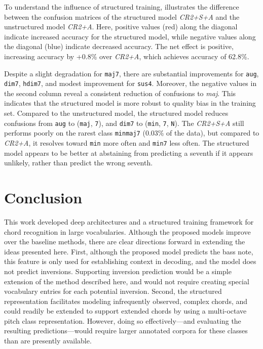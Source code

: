 \documentclass{article}
\begin{document}
To understand the influence of structured training,  illustrates the difference between the confusion matrices of the structured model \emph{CR2+S+A} and the unstructured model \emph{CR2+A}.
Here, positive values (red) along the diagonal indicate increased accuracy for the structured model, while negative values along the diagonal (blue) indicate decreased accuracy.
The net effect is positive, increasing accuracy by +0.8\% over \emph{CR2+A}, which achieves accuracy of 62.8\%.

Despite a slight degradation for \texttt{maj7}, there are substantial improvements for \texttt{aug}, \texttt{dim7}, \texttt{hdim7}, and modest improvement for \texttt{sus4}.
Moreover, the negative values in the second column reveal a consistent reduction of confusions to \emph{maj}.
This indicates that the structured model is more robust to quality bias in the training set.
Compared to the unstructured model, the structured model reduces confusions from \texttt{aug} to (\texttt{maj}, \texttt{7}), and \texttt{dim7} to (\texttt{min}, \texttt{7}, \texttt{N}).
The \emph{CR2+S+A} still performs poorly on the rarest class \texttt{minmaj7} (0.03\% of the data), but compared to \emph{CR2+A}, it resolves toward \texttt{min} more often and \texttt{min7} less often.
The structured model appears to be better at abstaining from predicting a seventh if it appears unlikely, rather than predict the wrong seventh.


\section{Conclusion}
This work developed deep architectures and a structured training framework for chord recognition in large vocabularies.
Although the proposed models improve over the baseline methods, there are clear directions forward in extending the ideas presented here.
First, although the proposed model predicts the bass note, this feature is only used for establishing context in decoding, and the model does not predict inversions.
Supporting inversion prediction would be a simple extension of the method described here, and would not require creating special vocabulary entries for each potential inversion.
Second, the structured representation facilitates modeling infrequently observed, complex chords, and could readily be extended to support extended chords by using a multi-octave pitch class representation.
However, doing so effectively---and evaluating the resulting predictions---would require larger annotated corpora for these classes than are presently available.

%       




\end{document}
